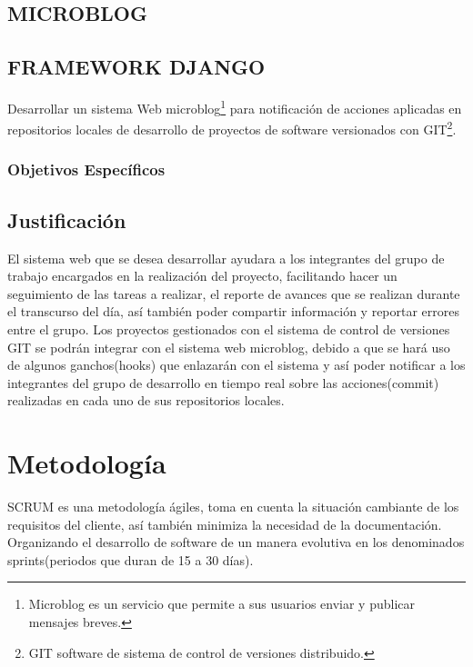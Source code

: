 \subsection{MICROBLOG}

\subsection{FRAMEWORK DJANGO}
Desarrollar un sistema Web microblog\footnote{Microblog es un servicio que permite a sus usuarios enviar y publicar mensajes breves.
} para notificación de acciones aplicadas en repositorios locales de desarrollo de proyectos de software versionados con GIT\footnote{GIT software de sistema de control de versiones distribuido.
}.

\subsubsection{Objetivos Específicos}

\subsection{Justificación}
El sistema web que se desea desarrollar ayudara  a los integrantes del grupo de trabajo encargados en la realización del proyecto, facilitando hacer un seguimiento de las tareas a realizar, el reporte de avances que se realizan durante el transcurso del día, así también poder compartir información y reportar errores entre el grupo.
Los proyectos gestionados con el sistema de control de versiones GIT se podrán integrar con el sistema web microblog, debido a que se hará uso de algunos ganchos(hooks) que enlazarán con el sistema y así poder notificar a los integrantes del grupo de desarrollo en tiempo real sobre las acciones(commit) realizadas en cada uno de sus repositorios locales.
\section{Metodología}
SCRUM es una metodología ágiles, toma en cuenta la situación cambiante de los requisitos del cliente, así también minimiza la necesidad de la documentación.
Organizando el desarrollo de software de un manera evolutiva en los denominados sprints(periodos que duran de 15 a 30 días).


%
